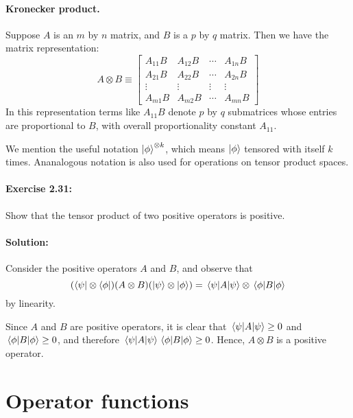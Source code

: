 \paragraph{Kronecker product.} Suppose $A$ is an $m$ by $n$ matrix, and $B$ is
a $p$ by $q$ matrix. Then we have the matrix representation: \begin{equation}
  A \otimes B \equiv \begin{bmatrix}
    A_{11}B & A_{12}B & \cdots & A_{1n}B \\
    A_{21}B & A_{22}B & \cdots & A_{2n}B \\
    \vdots & \vdots & \vdots & \vdots \\
    A_{m1}B & A_{m2}B & \cdots & A_{mn}B
  \end{bmatrix} \label{eq:kro-prod}
\end{equation}
In this representation terms like $A_{11}B$ denote $p$ by $q$ submatrices whose
entries are proportional to $B$, with overall proportionality constant
$A_{11}$.

We mention the useful notation $\ket{\phi}^{\otimes k}$, which means
$\ket{\phi}$ tensored with itself $k$ times. Ananalogous notation is also used
for operations on tensor product spaces.

\paragraph{\cite{mikeandike} Exercise 2.31:} Show that the tensor product of
two positive operators is positive.

\paragraph{Solution:} Consider the positive operators $A$ and $B$, and observe
that \begin{equation*}
  (\bra{\psi} \otimes \bra{\phi})(A \otimes B)(\ket{\psi} \otimes \ket{\phi})
  = \mel{\psi}{A}{\psi} \otimes \mel{\phi}{B}{\phi}
\end{equation*} by linearity.

Since $A$ and $B$ are positive operators, it is clear that $\mel{\psi}{A}{\psi}
\geq 0$ and $\mel{\phi}{B}{\phi} \geq 0$, and therefore $\mel{\psi}{A}{\psi}
\mel{\phi}{B}{\phi} \geq 0$. Hence, $A \otimes B$ is a positive operator.

\section{Operator functions}


